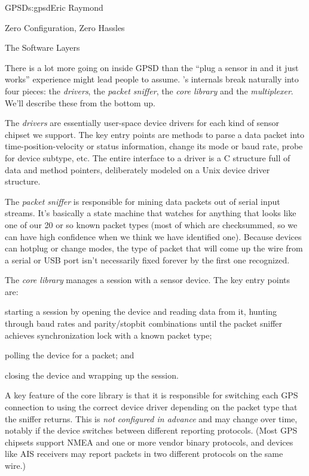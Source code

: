 \begin{aosachapter}{GPSD}{s:gpsd}{Eric Raymond}
\begin{aosasect1}{Zero Configuration, Zero Hassles}
\end{aosasect1}

\begin{aosasect1}{The Software Layers}

There is a lot more going on inside GPSD than the ``plug a sensor in
and it just works'' experience might lead people to assume.
's internals break naturally into four pieces: the
\emph{drivers}, the \emph{packet sniffer}, the \emph{core library} and
the \emph{multiplexer}. We'll describe these from the bottom up.

The \emph{drivers} are essentially user-space device drivers for each
kind of sensor chipset we support.  The key entry points are methods
to parse a data packet into time-position-velocity or status
information, change its mode or baud rate, probe for device subtype,
etc.  The entire interface to a driver is a C structure full of data
and method pointers, deliberately modeled on a Unix device driver
structure.

The \emph{packet sniffer} is responsible for mining data packets out
of serial input streams.  It's basically a state machine that watches
for anything that looks like one of our 20 or so known packet types
(most of which are checksummed, so we can have high confidence when we
think we have identified one).  Because devices can hotplug or change
modes, the type of packet that will come up the wire from a serial or
USB port isn't necessarily fixed forever by the first one recognized.

The \emph{core library} manages a session with a sensor device.  The
key entry points are:

\begin{aosaitemize}

  \item starting a session by opening the device and reading data from
    it, hunting through baud rates and parity/stopbit combinations
    until the packet sniffer achieves synchronization lock with a
    known packet type;

  \item polling the device for a packet; and

  \item closing the device and wrapping up the session.

\end{aosaitemize}

A key feature of the core library is that it is responsible for
switching each GPS connection to using the correct device driver
depending on the packet type that the sniffer returns.  This is
\emph{not configured in advance} and may change over time, notably if
the device switches between different reporting protocols.  (Most GPS
chipsets support NMEA and one or more vendor binary protocols, and
devices like AIS receivers may report packets in two different
protocols on the same wire.)


\end{aosasect1}
\end{aosachapter}
